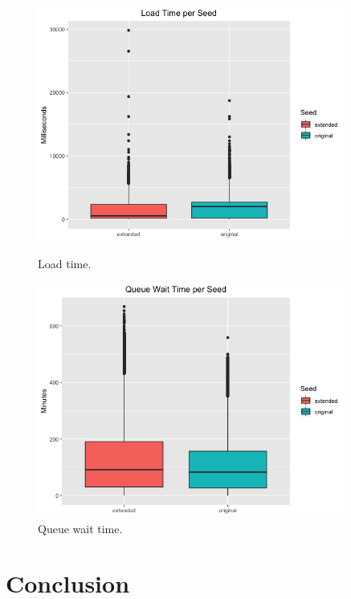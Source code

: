 \documentclass{article}
\begin{document}
\begin{figure}
	\begin{minipage}{0.45\textwidth}
		\centering
		\includegraphics[width=0.9\textwidth]{load_time.png}
		\caption{Load time.}
		\label{fig:3}
	\end{minipage}\hfill
	\begin{minipage}{0.45\textwidth}
		\centering
		\includegraphics[width=0.9\textwidth]{queue_wait_time.png}
		\caption{Queue wait time.}
		\label{fig:4}
	\end{minipage}
\end{figure}

\section{Conclusion}




\end{document}
